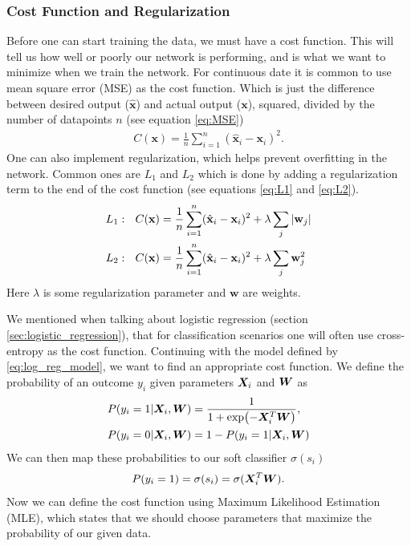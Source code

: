 \documentclass[12pt]{extarticle}
\begin{document}
\subsubsection{Cost Function and Regularization}\label{sec:cost_func_and_regul}
Before one can start training the data, we must have a cost function. This will tell us how well or poorly our network is performing, and is what we want to minimize when we train the network. For continuous date it is common to use mean square error (MSE) as the cost function. Which is just the difference between desired output ($\hat{\mathbf{x}}$) and actual output ($\mathbf{x}$), squared, divided by the number of datapoints $n$ (see equation \eqref{eq:MSE})
\begin{align}
	C(\mathbf{x}) = \frac{1}{n}\sum_{i=1}^{n}(\hat{\mathbf{x}}_i - \mathbf{x}_i)^2.
	\label{eq:MSE}
\end{align}
One can also implement regularization, which helps prevent overfitting in the network. Common ones are $L_1$ and $L_2$ which is done by adding a regularization term to the end of the cost function (see equations \eqref{eq:L1} and \eqref{eq:L2}).
\begin{align}
	L_1: \ \ C(\mathbf{x}) &= \frac{1}{n}\sum_{i=1}^{n}(\hat{\mathbf{x}}_i - \mathbf{x}_i)^2 + \lambda\sum_j \abs{\mathbf{w}_j} \label{eq:L1} \\
	L_2: \ \ C(\mathbf{x}) &= \frac{1}{n}\sum_{i=1}^{n}(\hat{\mathbf{x}}_i - \mathbf{x}_i)^2 + \lambda\sum_j \mathbf{w}^2_j \label{eq:L2}
\end{align}
Here $\lambda$ is some regularization parameter and $\mathbf{w}$ are weights.

We mentioned when talking about logistic regression (section \ref{sec:logistic_regression}), that for classification scenarios one will often use cross-entropy as the cost function. Continuing with the model defined by \eqref{eq:log_reg_model}, we want to find an appropriate cost function. We define the probability of an outcome $y_i$ given parameters $\boldsymbol X_i$ and $\boldsymbol W$ as
\begin{align}
	P(y_i = 1|\boldsymbol X_i, \boldsymbol W) &= \frac{1}{1 + \exp(-\boldsymbol X_i^T \boldsymbol W)}, \\
	P(y_i = 0|\boldsymbol X_i, \boldsymbol W) &= 1 - P(y_i = 1|\boldsymbol X_i, \boldsymbol W)
\end{align}
We can then map these probabilities to our soft classifier $\sigma(s_i)$
\begin{align}
	P(y_i = 1) = \sigma(s_i) = \sigma(\boldsymbol X_i^T \boldsymbol W).
\end{align}
Now we can define the cost function using Maximum Likelihood Estimation (MLE), which states that we should choose parameters that maximize the probability of our given data.
\end{document}
